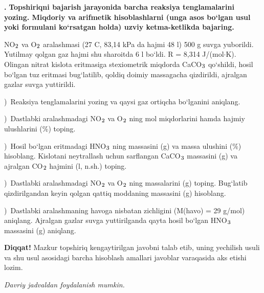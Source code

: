 \documentclass[11pt,a4paper]{article}
\renewcommand{\textsubscript}[1]{\ensuremath{_{\text{\fontsize{8}{8}\selectfont #1}}}}
\newcommand{\qn}[1]{\textbf{\fontsize{11.5}{13}\selectfont #1}}
\newcommand{\qsep}{\par\vspace{13pt}}
\newcommand{\diqqat}[1]{\par\smallskip\noindent\textbf{Diqqat!} #1\par\medskip}
\newcommand{\hdrpill}[1]{\begin{tikzpicture}[baseline=0pt]\node[fill=ygreen,text=white,rounded corners=8pt,inner xsep=10pt,inner ysep=5pt,font=\fontsize{13}{15}\bfseries\selectfont] at (0,0.475){#1};\end{tikzpicture}}
\newcommand{\curvar}{}\fancyhead[R]{\hdrpill{\curvar}}
\begin{document}
\noindent\qn{43.} \textbf{Topshiriqni bajarish jarayonida barcha reaksiya tenglamalarini yozing. Miqdoriy va arifmetik hisoblashlarni (unga asos bo`lgan usul yoki formulani ko`rsatgan holda) uzviy ketma-ketlikda bajaring.}\par\smallskip
NO\textsubscript{2} va O\textsubscript{2} aralashmasi (27 \textdegree{}C, 83,14 kPa da hajmi 48 l) 500 g suvga yuborildi. Yutilmay qolgan gaz hajmi shu sharoitda 6 l bo`ldi. R = 8,314 J/(mol$\cdot$K). Olingan nitrat kislota eritmasiga stexiometrik miqdorda CaCO\textsubscript{3} qo`shildi, hosil bo`lgan tuz eritmasi bug`latilib, qoldiq doimiy massagacha qizdirildi, ajralgan gazlar suvga yuttirildi.\par
{})\ Reaksiya tenglamalarini yozing va qaysi gaz ortiqcha bo`lganini aniqlang.\par
{})\ Dastlabki aralashmadagi NO\textsubscript{2} va O\textsubscript{2} ning mol miqdorlarini hamda hajmiy ulushlarini (\%) toping.\par
{})\ Hosil bo`lgan eritmadagi HNO\textsubscript{3} ning massasini (g) va massa ulushini (\%) hisoblang. Kislotani neytrallash uchun sarflangan CaCO\textsubscript{3} massasini (g) va ajralgan CO\textsubscript{2} hajmini (l, n.sh.) toping.\par
{})\ Dastlabki aralashmadagi NO\textsubscript{2} va O\textsubscript{2} ning massalarini (g) toping. Bug`latib qizdirilgandan keyin qolgan qattiq moddaning massasini (g) hisoblang.\par
{})\ Dastlabki aralashmaning havoga nisbatan zichligini (M(havo) = 29 g/mol) aniqlang. Ajralgan gazlar suvga yuttirilganda qayta hosil bo`lgan HNO\textsubscript{3} massasini (g) aniqlang.\par
\diqqat{Mazkur topshiriq kengaytirilgan javobni talab etib, uning yechilish usuli va shu usul asosidagi barcha hisoblash amallari javoblar varaqasida aks etishi lozim.}\qsep
\newpage
\renewcommand{\curvar}{18-variant}
\thispagestyle{first}
\noindent\textit{Davriy jadvaldan foydalanish mumkin.}
\par\smallskip
\end{document}
